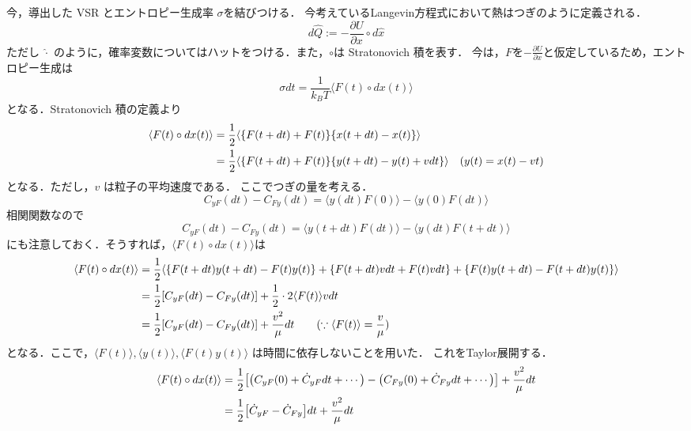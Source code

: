 \documentclass{jsarticle}
\numberwithin{equation}{section}
\theoremstyle{definition}
\newcommand{\ave}[1]{\langle #1 \rangle}
\begin{document}
\newpage 
今，導出した VSR とエントロピー生成率 $\sigma$を結びつける．
今考えているLangevin方程式において熱はつぎのように定義される．
\begin{equation}
  d \hat{Q} := - \frac{\partial U}{\partial x} \circ  d \hat{x} 
\end{equation}
ただし $\hat{\cdot}$ のように，確率変数についてはハットをつける．また，$\circ $は Stratonovich 積を表す．
今は，$F$を$- \frac{\partial U}{\partial x}$と仮定しているため，エントロピー生成は
\begin{equation}
  \label{entropyprob1}
  \sigma dt = \frac{1}{k_B T} \langle F(t) \circ dx(t) \rangle
\end{equation}
となる．Stratonovich 積の定義より
\begin{align}
  \langle F(t) \circ dx(t) \rangle &= \frac{1}{2} \langle \qty{ F(t + dt) + F(t) } \qty{ x(t + dt) - x(t) } \rangle \\
  &= \frac{1}{2} \langle \qty{ F(t + dt) + F(t) } \qty{ y(t + dt) - y(t) + vdt } \rangle \quad (y(t) = x(t) - vt)
\end{align}
となる．ただし，$v$ は粒子の平均速度である．
ここでつぎの量を考える．
\begin{equation}
  C_{yF}(dt) - C_{Fy} (dt) = \langle y(dt)F(0) \rangle - \langle y(0)F(dt) \rangle
\end{equation}
相関関数なので
\begin{equation}
  C_{yF}(dt) - C_{Fy} (dt) = \langle y(t + dt)F(dt) \rangle - \langle y(dt)F(t + dt) \rangle
\end{equation}
にも注意しておく．そうすれば，$\langle F(t) \circ dx(t) \rangle$は
\begin{align}
  \langle F(t) \circ dx(t) \rangle &= \frac{1}{2} \langle \qty{ F(t + dt)y(t + dt) - F(t)y(t)} + \qty{ F(t + dt)vdt + F(t)vdt} + \qty{ F(t)y(t + dt) - F(t + dt)y(t) } \rangle \\
  &= \frac{1}{2} \qty[ C_{yF}(dt) - C_{Fy} (dt) ] + \frac{1}{2} \cdot 2 \langle F(t) \rangle vdt \\
  &= \frac{1}{2} \qty[ C_{yF}(dt) - C_{Fy} (dt) ] + \frac{v^2}{\mu } dt \quad \quad (\because \langle F(t) \rangle = \frac{v}{\mu })
\end{align}
となる．ここで，$\ave{F(t)}, \ave{y(t)}, \ave{F(t)y(t)}$ は時間に依存しないことを用いた．
これをTaylor展開する．
\begin{align}
  \langle F(t) \circ dx(t) \rangle &= \frac{1}{2} \qty[ \qty( C_{yF}(0) + \dot{C}_{yF}dt + \cdots ) - \qty( C_{Fy}(0) + \dot{C}_{Fy}dt + \cdots  ) ] + \frac{v^2}{\mu } dt \\
  &= \frac{1}{2} \qty[ \dot{C}_{yF} - \dot{C}_{Fy} ] dt + \frac{v^2}{\mu } dt
\end{align}
\end{document}
